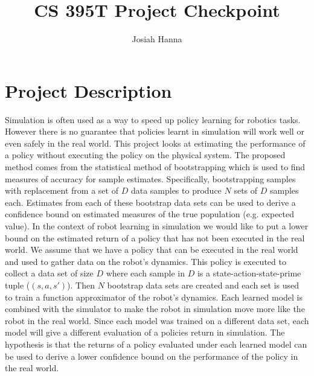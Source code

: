 \documentclass[12 pt]{article}
\author{Josiah Hanna}
\title{CS 395T Project Checkpoint}
\begin{document}
\maketitle

\section{Project Description}


Simulation is often used as a way to speed up policy learning for robotics tasks. 
However there is no guarantee that policies learnt in simulation will work well or even safely in the real world. 
This project looks at estimating the performance of a policy without executing the policy on the physical system.
The proposed method comes from the statistical method of bootstrapping which is used to find measures of accuracy for sample estimates.
Specifically, bootstrapping samples with replacement from a set of $D$ data samples to produce $N$ sets of $D$ samples each.
Estimates from each of these bootstrap data sets can be used to derive a confidence bound on estimated measures of the true population (e.g. expected value).
In the context of robot learning in simulation we would like to put a lower bound on the estimated return of a policy that has not been executed in the real world.
We assume that we have a policy that can be executed in the real world and used to gather data on the robot's dynamics.
This policy is executed to collect a data set of size $D$ where each sample in $D$ is a state-action-state-prime tuple ($(s,a,s')$).
Then $N$ bootstrap data sets are created and each set is used to train a function approximator of the robot's dynamics.
Each learned model is combined with the simulator to make the robot in simulation move more like the robot in the real world.
Since each model was trained on a different data set, each model will give a different evaluation of a policies return in simulation. The hypothesis is that the returns of a policy evaluated under each learned model can be used to derive a lower confidence bound on the performance of the policy in the real world.
\end{document}
